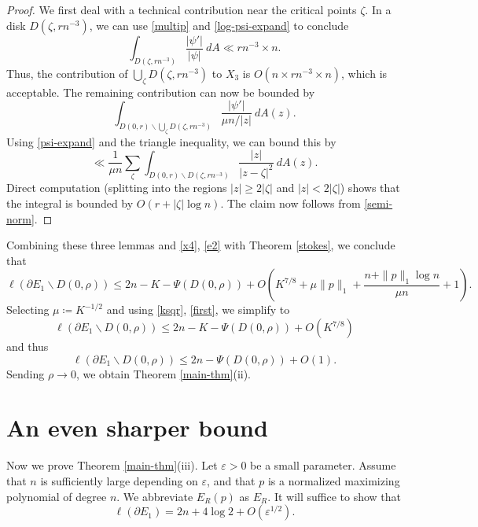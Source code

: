 \documentclass[12pt]{amsart}
\newcommand{\eps}{\varepsilon}
\begin{document}
\begin{proof}
We first deal with a technical contribution near the critical points $\zeta$.  In a disk $D(\zeta,rn^{-3})$, we can use \eqref{multip} and \eqref{log-psi-expand} to conclude
$$ \int_{D(\zeta,rn^{-3})} \frac{|\psi'|}{|\psi|}\ dA \ll rn^{-3} \times n.$$
Thus, the contribution of $\bigcup_\zeta D(\zeta,rn^{-3})$ to $X_3$ is $O(n \times rn^{-3} \times n)$, which is acceptable.  The remaining contribution can now be bounded by
$$ \int_{D(0,r) \backslash \bigcup_\zeta D(\zeta,rn^{-3})} \frac{|\psi'|}{\mu n/|z|}\ dA(z).$$
Using \eqref{psi-expand} and the triangle inequality, we can bound this by
$$
\ll \frac{1}{\mu n} \sum_\zeta \int_{D(0,r) \backslash D(\zeta,rn^{-3})} \frac{|z|}{|z-\zeta|^2}\ dA(z).$$
Direct computation (splitting into the regions $|z| \geq 2|\zeta|$ and $|z| < 2 |\zeta|$) shows that the integral is bounded by $O( r + |\zeta| \log n)$.  The claim now follows from \eqref{semi-norm}.
\end{proof}

Combining these three lemmas and \eqref{x4}, \eqref{e2} with Theorem \ref{stokes}, we conclude that
$$ \ell(\partial E_1 \backslash D(0,\rho)) \leq 2n - K - \Psi(D(0,\rho)) + O\left( K^{7/8} + \mu \|p\|_1 + \frac{n+\|p\|_1 \log n}{\mu n} + 1\right).$$
Selecting $\mu \coloneqq K^{-1/2}$ and using \eqref{ksqr}, \eqref{first}, we simplify to
\begin{equation}\label{lio}
     \ell(\partial E_1 \backslash D(0,\rho)) \leq 2n - K - \Psi(D(0,\rho)) + O( K^{7/8})
\end{equation}
and thus
\begin{equation}\label{lio-2}
 \ell(\partial E_1 \backslash D(0,\rho)) \leq 2n - \Psi(D(0,\rho)) + O(1).
\end{equation}
Sending $\rho \to 0$, we obtain Theorem \ref{main-thm}(ii).


\section{An even sharper bound}\label{main-iii-sec}

Now we prove Theorem \ref{main-thm}(iii).  Let $\eps > 0$ be a small parameter. Assume that $n$ is sufficiently large depending on $\eps$, and that $p$ is a normalized maximizing polynomial of degree $n$.  We abbreviate $E_R(p)$ as $E_R$. It will suffice to show that
\begin{equation}\label{lupin-targ}
 \ell(\partial E_1) = 2n + 4 \log 2 + O(\eps^{1/2}).
\end{equation}
\end{document}

